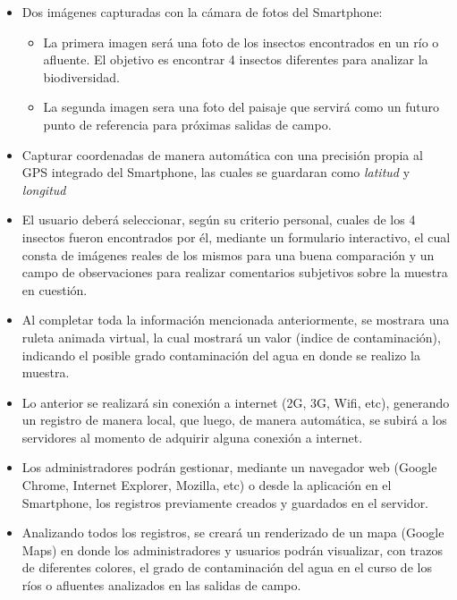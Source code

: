       \begin{itemize}
        \item Dos imágenes capturadas con la cámara de fotos del Smartphone:
        
        \begin{itemize}
          \item La primera imagen será una foto de los insectos encontrados en un río o afluente. El objetivo es encontrar 4 insectos diferentes para analizar la biodiversidad.
         
          \item La segunda imagen sera una foto del paisaje que servirá como un futuro punto de referencia para próximas salidas de campo. 
        \end{itemize}
        
        \item Capturar coordenadas de manera automática con una precisión propia al GPS integrado del Smartphone, las cuales se guardaran como \emph{latitud} y \emph{longitud}
        
        \item El usuario deberá seleccionar, según su criterio personal, cuales de los 4 insectos fueron encontrados por él, mediante un formulario interactivo, el cual consta de imágenes reales de los mismos para una buena comparación y un campo de observaciones para realizar comentarios subjetivos sobre la muestra en cuestión.
        
        \item Al completar toda la información mencionada anteriormente, se mostrara una ruleta animada virtual, la cual mostrará un valor (indice de contaminación), indicando el posible grado contaminación del agua en donde se realizo la muestra.

        \item Lo anterior se realizará sin conexión a internet (2G, 3G, Wifi, etc), generando un registro de manera local, que luego, de manera automática, se subirá a los servidores al momento de adquirir alguna conexión a internet.

        \item Los administradores podrán gestionar, mediante un navegador web (Google Chrome, Internet Explorer, Mozilla, etc) o desde la aplicación en el Smartphone, los registros previamente creados y guardados en el servidor.

        \item Analizando todos los registros, se creará un renderizado de un mapa  (Google Maps) en donde los administradores y usuarios podrán visualizar, con trazos de diferentes colores, el grado de contaminación del agua en el curso de los ríos o afluentes analizados en las salidas de campo.
      \end{itemize}

